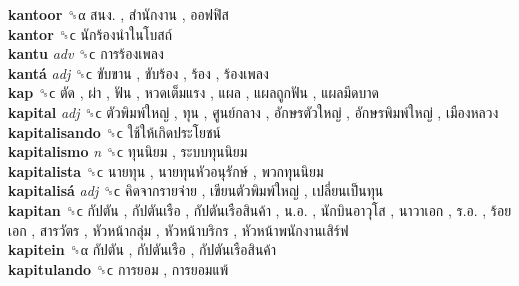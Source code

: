 \textbf{kantoor} ␝α   สนง. ,  สำนักงาน ,  ออฟฟิส   \\
\textbf{kantor} ␝ϲ   นักร้องนำในโบสถ์   \\
\textbf{kantu} \emph{adv}  ␝ϲ   การร้องเพลง   \\
\textbf{kantá} \emph{adj}  ␝ϲ   ขับขาน ,  ขับร้อง ,  ร้อง ,  ร้องเพลง   \\
\textbf{kap} ␝ϲ   ตัด ,  ผ่า ,  ฟัน ,  หวดเต็มแรง ,  แผล ,  แผลถูกฟัน ,  แผลมีดบาด   \\
\textbf{kapital} \emph{adj}  ␝ϲ   ตัวพิมพ์ใหญ่ ,  ทุน ,  ศูนย์กลาง ,  อักษรตัวใหญ่ ,  อักษรพิมพ์ใหญ่ ,  เมืองหลวง   \\
\textbf{kapitalisando} ␝ϲ   ใช้ให้เกิดประโยชน์   \\
\textbf{kapitalismo} \emph{n}  ␝ϲ   ทุนนิยม ,  ระบบทุนนิยม   \\
\textbf{kapitalista} ␝ϲ   นายทุน ,  นายทุนหัวอนุรักษ์ ,  พวกทุนนิยม   \\
\textbf{kapitalisá} \emph{adj}  ␝ϲ   คิดจากรายจ่าย ,  เขียนตัวพิมพ์ใหญ่ ,  เปลี่ยนเป็นทุน   \\
\textbf{kapitan} ␝ϲ   กัปตัน ,  กัปตันเรือ ,  กัปตันเรือสินค้า ,  น.อ. ,  นักบินอาวุโส ,  นาวาเอก ,  ร.อ. ,  ร้อยเอก ,  สารวัตร ,  หัวหน้ากลุ่ม ,  หัวหน้าบริกร ,  หัวหน้าพนักงานเสิร์ฟ   \\
\textbf{kapitein} ␝α   กัปตัน ,  กัปตันเรือ ,  กัปตันเรือสินค้า   \\
\textbf{kapitulando} ␝ϲ   การยอม ,  การยอมแพ้   \\

